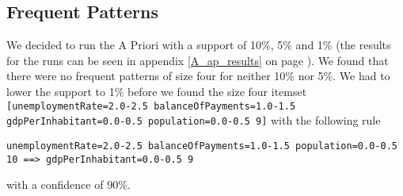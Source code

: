 \subsection{Frequent Patterns}
\label{Res_FP}

We decided to run the A Priori with a support of 10\%, 5\% and 1\% (the results for the runs can be seen in appendix \ref{A_ap_results} on page \pageref{A_ap_results}). We found that there were no frequent patterns of size four for neither 10\% nor 5\%. We had to lower the support to 1\% before we found the size four itemset \texttt{[unemploymentRate=2.0-2.5 balanceOfPayments=1.0-1.5 gdpPerInhabitant=0.0-0.5 population=0.0-0.5 9]} with the following rule

\begin{center}
	\texttt{unemploymentRate=2.0-2.5 balanceOfPayments=1.0-1.5 population=0.0-0.5 10 ==> gdpPerInhabitant=0.0-0.5 9}
\end{center}

with a confidence of 90\%.

